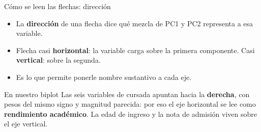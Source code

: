 \documentclass[aspectratio=169,xcolor=dvipsnames]{beamer}
\begin{document}

\begin{frame}{C\'omo se leen las flechas: direcci\'on}
    \begin{itemize}
        \item La \textbf{direcci\'on} de una flecha dice qu\'e mezcla de PC1 y PC2 representa a esa variable.
        \item Flecha casi \textbf{horizontal}: la variable carga sobre la primera componente. Casi \textbf{vertical}: sobre la segunda.
        \item Es lo que permite ponerle \alert{nombre sustantivo} a cada eje.
    \end{itemize}
    \vfill
    \begin{exampleblock}{En nuestro biplot}
        Las seis variables de cursada apuntan hacia la \textbf{derecha}, con pesos del mismo signo y magnitud parecida: por eso el eje horizontal se lee como \textbf{rendimiento acad\'emico}. La edad de ingreso y la nota de admisi\'on viven sobre el eje vertical.
    \end{exampleblock}
\end{frame}
\end{document}
